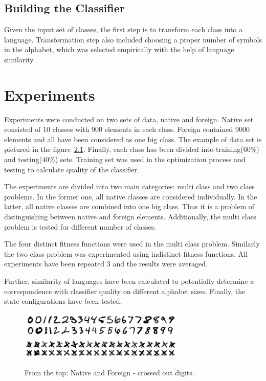 \documentclass{mini}
\begin{document}
\section{Building the Classifier}\label{sec:classification_transf_step}
Given the input set of classes, the first step is to transform each class into a language. Transformation step also included choosing a proper number of symbols in the alphabet, which was selected empirically with the help of language similarity.



\chapter{Experiments}\label{chap:experiments}

Experiments were conducted on two sets of data, native and foreign. Native set consisted of 10 classes with 900 elements in each class. Foreign contained 9000 elements and all have been considered as one big class. The example of data set is pictured in the figure~\ref{fig:native_foreign_png}. Finally, each class has been divided into training($60\%$) and testing($40\%$) sets. Training set was used in the optimization process and testing to calculate quality of the classifier.

The experiments are divided into two main categories: multi class and two class problems. In the former one, all native classes are considered individually. In the latter, all native classes are combined into one big class. Thus it is a problem of distinguishing between native and foreign elements. Additionally, the multi class problem is tested for different number of classes.

The four distinct fitness functions were used in the multi class problem. Similarly the two class problem was experimented using indistinct fitness functions. All experiments have been repeated $3$ and the results were averaged.

Further, similarity of languages have been calculated to potentially determine a correspondence with classifier quality on different alphabet sizes. Finally, the state configurations have been tested.

\begin{figure}
    \includegraphics[width=0.7\textwidth]{./images/native.png}
    \includegraphics[width=0.7\textwidth]{./images/crossedout.png}
    \caption{From the top: Native and Foreign - crossed out digits.}
    \label{fig:native_foreign_png}
\end{figure}
\end{document}

